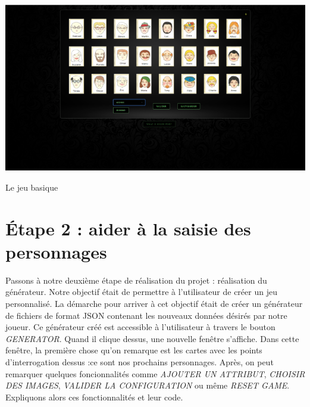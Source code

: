 \documentclass[a4paper, 12pt]{article}
\begin{document}
\begin{center}               %
  \includegraphics[scale=0.4]{jeubasique.png}\newline   %
\end{center}
\begin{center}
Le jeu basique
\end{center}

\section{Étape 2 : aider  à la saisie  des personnages}

Passons à notre deuxième étape de réalisation du projet : réalisation du générateur. \newline
Notre objectif était de permettre à l'utilisateur de créer un jeu personnalisé. La démarche pour arriver à cet objectif était de créer un générateur de fichiers de format JSON contenant les nouveaux données désirés par notre joueur. \newline
Ce générateur créé est accessible à l'utilisateur à travers le bouton 
\textit{GENERATOR}. Quand il clique dessus, une nouvelle fenêtre s'affiche. Dans cette fenêtre, la première chose qu'on remarque est les cartes avec les points d'interrogation dessus :ce sont nos prochains personnages. Après, on peut remarquer quelques foncionnalités comme \textit{AJOUTER UN ATTRIBUT}, \textit{CHOISIR DES IMAGES}, \textit{VALIDER LA CONFIGURATION} ou même \textit{RESET GAME}. \newline
Expliquons alors ces fonctionnalités et leur code.\newline
\end{document}

